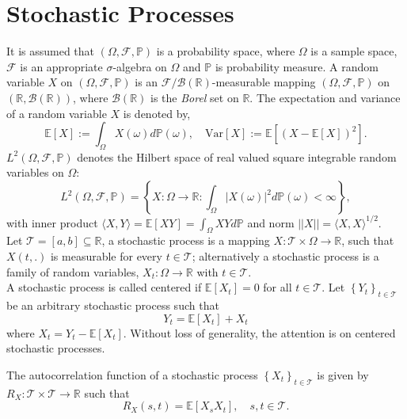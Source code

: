 \section{Stochastic Processes}
It is assumed that $\left(\Omega,\mathcal{F},\mathbb{P}\right)$ is a probability space, where $\Omega$ is a sample space, $\mathcal{F}$ is an appropriate $\sigma$-algebra on $\Omega$ and $\mathbb{P}$ is probability measure. A random variable $X$ on $\left(\Omega,\mathcal{F},\mathbb{P}\right)$ is an $\mathcal{F}/\mathcal{B}(\mathbb{R})$-measurable mapping $ \left(\Omega,\mathcal{F},\mathbb{P}\right)$ on $\left(\mathbb{R},\mathcal{B}(\mathbb{R})\right)$, where $\mathcal{B}(\mathbb{R})$ is the \textit{Borel} set on $\mathbb{R}$. The expectation and variance of a random variable $X$ is denoted by,
\begin{equation*}
\mathbb{E}\left[X\right] := \int_{\Omega} X(\omega)d\mathbb{P}(\omega),\quad \text{Var}\left[X\right] :=  \mathbb{E}\left[\left(X - \mathbb{E}\left[X\right]\right)^2\right].
\end{equation*}
$L^2\left(\Omega,\mathcal{F},\mathbb{P}\right)$ denotes the Hilbert space of real valued square integrable random variables on $\Omega$:
\begin{equation*}
L^2\left(\Omega,\mathcal{F},\mathbb{P}\right) = \left\{X: \Omega \rightarrow \mathbb{R}: \int_{\Omega} |X(\omega)|^2 d\mathbb{P}(\omega) < \infty \right\},
\end{equation*}
with inner product $\langle X,Y \rangle = \mathbb{E}\left[XY\right] = \int_{\Omega} X Y d\mathbb{P}$ and norm $||X|| = \langle X,X \rangle^{1/2}$.\\
Let $\mathcal{T} = \left[a,b\right] \subseteq \mathbb{R}$, a stochastic process is a mapping $X: \mathcal{T} \times \Omega \rightarrow \mathbb{R}$, such that $X(t,.)$ is measurable for every $t \in \mathcal{T}$; alternatively a stochastic process is a family of random variables, $X_t : \Omega \rightarrow \mathbb{R}$ with $t \in \mathcal{T}$.\\
A stochastic process is called centered if $\mathbb{E}\left[X_t\right] = 0$ for all $t \in \mathcal{T}$. Let $\left\{Y_t\right\}_{t \in \mathcal{T}}$ be an arbitrary stochastic process such that
\begin{equation*}
Y_t = \mathbb{E}\left[X_t\right] + X_t
\end{equation*}  
where $X_t = Y_t - \mathbb{E}\left[X_t\right]$. Without loss of generality, the attention is on centered stochastic processes.
\begin{definition}
The autocorrelation function of a stochastic process $\left\{X_t\right\}_{t \in \mathcal{T}}$ is given by $R_X: \mathcal{T} \times \mathcal{T} \rightarrow \mathbb{R}$ such that
\begin{equation*}
R_X(s,t) = \mathbb{E}\left[X_s X_t\right], \quad s,t \in \mathcal{T}.
\end{equation*} 
\end{definition}

